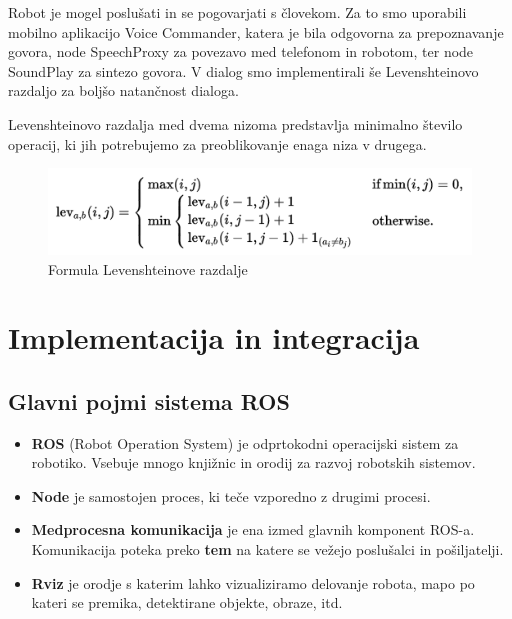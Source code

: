 \documentclass[a4paper,11pt]{article}
\begin{document}
Robot je mogel poslušati in se pogovarjati s človekom. Za to smo uporabili mobilno aplikacijo Voice Commander, katera je bila odgovorna za prepoznavanje govora, node SpeechProxy za povezavo med telefonom in robotom, ter node SoundPlay za sintezo govora. V dialog smo implementirali še Levenshteinovo razdaljo za boljšo natančnost dialoga.

Levenshteinovo razdalja med dvema nizoma predstavlja minimalno število operacij, ki jih potrebujemo za preoblikovanje enaga niza v drugega.

\begin{figure}[h]
\begin{center}
\includegraphics[scale=0.8]{levenshtein.png}
\caption{Formula Levenshteinove razdalje}
\label{slika1}
\end{center}
\end{figure}


\section{Implementacija in integracija}

\subsection{Glavni pojmi sistema ROS}

\begin{itemize}
\item \textbf{ROS} (Robot Operation System) je odprtokodni operacijski sistem za robotiko. Vsebuje mnogo knjižnic in orodij za razvoj robotskih sistemov.
\item \textbf{Node} je samostojen proces, ki teče vzporedno z drugimi procesi.
\item \textbf{Medprocesna komunikacija} je ena izmed glavnih komponent ROS-a. Komunikacija poteka preko \textbf{tem} na katere se vežejo poslušalci in pošiljatelji. 
\item \textbf{Rviz} je orodje s katerim lahko vizualiziramo delovanje robota, mapo po kateri se premika, detektirane objekte, obraze, itd.
\end{itemize}
\end{document}
